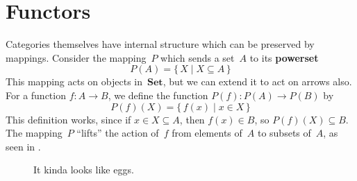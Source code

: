 \documentclass[letterpaper,12pt]{article}
\newcommand{\cat}[1]{\mathbf{#1}}
\newcommand{\Set}{\cat{Set}}
\newcommand{\textdefn}{\textbf}
\theoremstyle{definition}
\theoremstyle{plain}
\numberwithin{equation}{section}
\begin{document}
\section{Functors}
Categories themselves have internal structure which can be preserved by mappings. Consider the mapping~\(P\) which sends a set~\(A\) to its \textdefn{powerset}
\begin{equation}
P(A)=\{\,X\mid X\subseteq A\,\}
\label{eq:powersetset}
\end{equation}
This mapping acts on objects in~\(\Set\), but we can extend it to act on arrows also. For a function \(f:A\to B\), we define the function \(P(f):P(A)\to P(B)\) by
\begin{equation}
P(f)(X)=\{\,f(x)\mid x\in X\,\}
\label{eq:powersetfunc}
\end{equation}
This definition works, since if \(x\in X\subseteq A\), then \(f(x)\in B\), so \(P(f)(X)\subseteq B\). The mapping~\(P\) ``lifts'' the action of~\(f\) from elements of~\(A\) to subsets of~\(A\), as seen in .
\begin{figure}[h]
\centering
{}
\caption{It kinda looks like eggs.}
\label{fig:powerset}
\end{figure}
\end{document}
